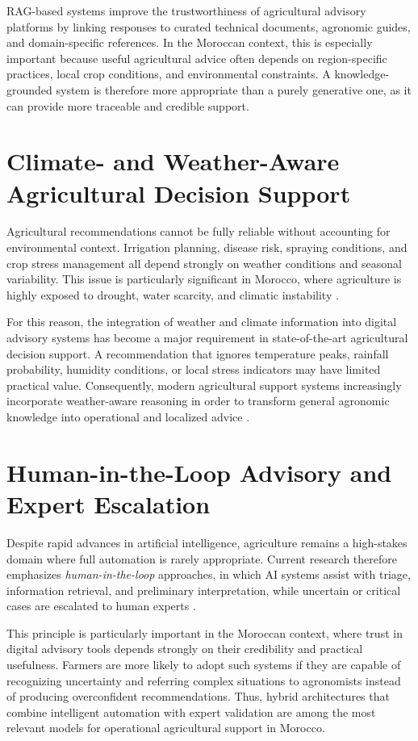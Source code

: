 RAG-based systems improve the trustworthiness of agricultural advisory platforms by linking responses to curated technical documents, agronomic guides, and domain-specific references. In the Moroccan context, this is especially important because useful agricultural advice often depends on region-specific practices, local crop conditions, and environmental constraints. A knowledge-grounded system is therefore more appropriate than a purely generative one, as it can provide more traceable and credible support.

\section{Climate- and Weather-Aware Agricultural Decision Support}

Agricultural recommendations cannot be fully reliable without accounting for environmental context. Irrigation planning, disease risk, spraying conditions, and crop stress management all depend strongly on weather conditions and seasonal variability. This issue is particularly significant in Morocco, where agriculture is highly exposed to drought, water scarcity, and climatic instability \cite{worldbank2024irrigation}.

For this reason, the integration of weather and climate information into digital advisory systems has become a major requirement in state-of-the-art agricultural decision support. A recommendation that ignores temperature peaks, rainfall probability, humidity conditions, or local stress indicators may have limited practical value. Consequently, modern agricultural support systems increasingly incorporate weather-aware reasoning in order to transform general agronomic knowledge into operational and localized advice \cite{worldbank2024irrigation}.

\section{Human-in-the-Loop Advisory and Expert Escalation}

Despite rapid advances in artificial intelligence, agriculture remains a high-stakes domain where full automation is rarely appropriate. Current research therefore emphasizes \textit{human-in-the-loop} approaches, in which AI systems assist with triage, information retrieval, and preliminary interpretation, while uncertain or critical cases are escalated to human experts \cite{li2025llm,yin2025foundation}.

This principle is particularly important in the Moroccan context, where trust in digital advisory tools depends strongly on their credibility and practical usefulness. Farmers are more likely to adopt such systems if they are capable of recognizing uncertainty and referring complex situations to agronomists instead of producing overconfident recommendations. Thus, hybrid architectures that combine intelligent automation with expert validation are among the most relevant models for operational agricultural support in Morocco.

